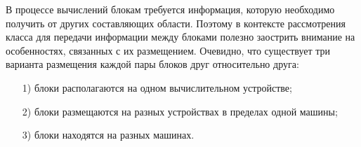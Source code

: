 \documentclass[a4paper, 14pt]{extarticle}
\theoremstyle{definition}
\begin{document}
\par В процессе вычислений блокам требуется информация, которую необходимо получить от других составляющих области. Поэтому в контексте рассмотрения класса для передачи информации между блоками полезно заострить внимание на особенностях, связанных с их размещением. Очевидно, что существует три варианта размещения каждой пары блоков друг относительно друга:
\begin{enumerate}
\item[1)] блоки располагаются на одном вычислительном устройстве;
\item[2)] блоки размещаются на разных устройствах в пределах одной машины;
\item[3)] блоки находятся на разных машинах.
\end{enumerate}

\begin{figure}[h]
	\begin{minipage}[h]{0.3\linewidth}
	\end{minipage}
	\hfill
	\begin{minipage}[h]{0.6\linewidth}

\end{minipage}
\end{figure}
\end{document}
